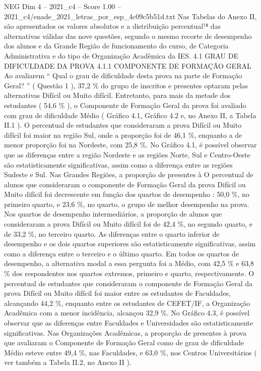 \begin{textsample}{NEG Dim 4 – 2021\_c4 – Score 1.00 – 2021\_c4/enade\_2021\_letras\_por\_esp\_4c09c5b51d.txt}
Nas Tabelas do Anexo II, são apresentados os valores absolutos e a distribuição percentual¹⁸ das alternativas válidas das nove questões, segundo o mesmo recorte de desempenho dos alunos e da Grande Região de funcionamento do curso, de Categoria Administrativa e do tipo de Organização Acadêmica da IES. 4.1 GRAU DE DIFICULDADE DA PROVA 4.1.1 COMPONENTE DE FORMAÇÃO GERAL Ao avaliarem “ Qual o grau de dificuldade desta prova na parte de Formação Geral? ” ( Questão 1 ), 37,2 \% do grupo de inscritos e presentes optaram pelas alternativas Difícil ou Muito difícil.
Entretanto, para mais da metade dos estudantes ( 54,6 \% ), o Componente de Formação Geral da prova foi avaliado com grau de dificuldade Médio ( Gráfico 4.1, Gráfico 4.2 e, no Anexo II, a Tabela II.1 ).
O percentual de estudantes que consideraram a prova Difícil ou Muito difícil foi maior na região Sul, onde a proporção foi de 46,1 \%, enquanto a de menor proporção foi na Nordeste, com 25,8 \%.
No Gráfico 4.1, é possível observar que as diferenças entre a região Nordeste e as regiões Norte, Sul e Centro-Oeste são estatisticamente significativas, assim como a diferença entre as regiões Sudeste e Sul.
Nas Grandes Regiões, a proporção de presentes à O percentual de alunos que consideraram o componente de Formação Geral da prova Difícil ou Muito difícil foi decrescente em função dos quartos de desempenho : 50,0 \%, no primeiro quarto, e 23,6 \%, no quarto, o grupo de melhor desempenho na prova.
Nos quartos de desempenho intermediários, a proporção de alunos que consideraram a prova Difícil ou Muito difícil foi de 42,4 \%, no segundo quarto, e de 33,2 \%, no terceiro quarto.
As diferenças entre o quarto inferior de desempenho e os dois quartos superiores são estatisticamente significativas, assim como a diferença entre o terceiro e o último quarto.
Em todos os quartos de desempenho, a alternativa modal a essa pergunta foi a Médio, com 42,5 \% e 63,8 \% dos respondentes nos quartos extremos, primeiro e quarto, respectivamente.
O percentual de estudantes que consideraram o componente de Formação Geral da prova Difícil ou Muito difícil foi maior entre os estudantes de Faculdades, alcançando 44,2 \%, enquanto entre os estudantes de CEFET/IF, a Organização Acadêmica com a menor incidência, alcançou 32,9 \%.
No Gráfico 4.3, é possível observar que as diferenças entre Faculdades e Universidades são estatisticamente significativas.
Nas Organizações Acadêmicas, a proporção de presentes à prova que avaliaram o Componente de Formação Geral como de grau de dificuldade Médio esteve entre 49,4 \%, nas Faculdades, e 63,0 \%, nos Centros Universitários ( ver também a Tabela II.2, no Anexo II ).

\end{textsample}
